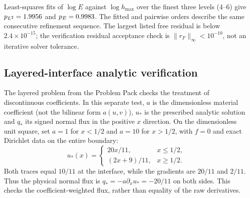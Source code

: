 \documentclass[11pt]{article}
\begin{document}
\begin{table}[H]
\centering
\small
\caption{Consecutive manufactured-solution refinements. $N_T$ is the triangle count and $r_F$ is the free-system algebraic residual. All five levels use a sparse direct solve; an iterative stopping tolerance is not applicable at any level.}
\label{tab:mms}
\begingroup
\setlength{\tabcolsep}{3pt}

\endgroup
\end{table}

Least-squares fits of $\log E$ against $\log h_{\max}$ over the finest three levels (4--6) give
$p_{L^2}=1.9956$ and $p_E=0.9983$. The fitted and pairwise orders describe the same consecutive refinement sequence. The largest listed free residual is below $2.4\times10^{-15}$; the verification residual acceptance check is $\|r_F\|_\infty<10^{-10}$, not an iterative solver tolerance.

\subsection{Layered-interface analytic verification}
The layered problem from the Problem Pack checks the treatment of discontinuous coefficients. In this separate test, $a$ is the dimensionless material coefficient (not the bilinear form $a(u,v)$), $u_*$ is the prescribed analytic solution and $q_*$ its signed normal flux in the positive $x$ direction. On the dimensionless unit square, set $a=1$ for $x<1/2$ and $a=10$ for $x>1/2$, with $f=0$ and exact Dirichlet data on the entire boundary:
\[
u_*(x)=\begin{cases}20x/11,&x\le1/2,\\(2x+9)/11,&x\ge1/2.\end{cases}
\]
Both traces equal $10/11$ at the interface, while the gradients are $20/11$ and $2/11$. Thus the physical normal flux is $q_*=-a\partial_xu_*=-20/11$ on both sides. This checks the coefficient-weighted flux, rather than equality of the raw derivatives.
\end{document}
